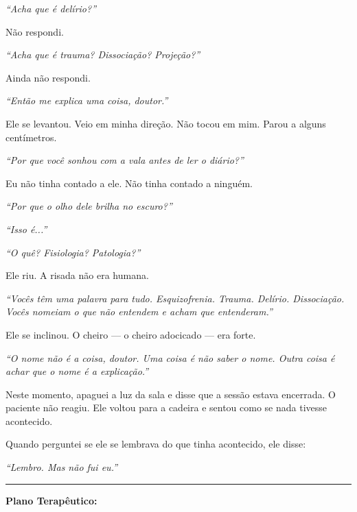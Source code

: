 \noindent \textit{\textquotedblleft{}Acha que é delírio?\textquotedblright{}}

\noindent Não respondi.

\noindent \textit{\textquotedblleft{}Acha que é trauma? Dissociação? Projeção?\textquotedblright{}}

\noindent Ainda não respondi.

\noindent \textit{\textquotedblleft{}Então me explica uma coisa, doutor.\textquotedblright{}}

\noindent Ele se levantou. Veio em minha direção. Não tocou em mim. Parou a alguns centímetros.

\noindent \textit{\textquotedblleft{}Por que você sonhou com a vala antes de ler o diário?\textquotedblright{}}

\noindent Eu não tinha contado a ele. Não tinha contado a ninguém.

\noindent \textit{\textquotedblleft{}Por que o olho dele brilha no escuro?\textquotedblright{}}

\noindent \textit{\textquotedblleft{}Isso é...\textquotedblright{}}

\noindent \textit{\textquotedblleft{}O quê? Fisiologia? Patologia?\textquotedblright{}}

\noindent Ele riu. A risada não era humana.

\noindent \textit{\textquotedblleft{}Vocês têm uma palavra para tudo. Esquizofrenia. Trauma. Delírio. Dissociação. Vocês nomeiam o que não entendem e acham que entenderam.\textquotedblright{}}

\noindent Ele se inclinou. O cheiro --- o cheiro adocicado --- era forte.

\noindent \textit{\textquotedblleft{}O nome não é a coisa, doutor. Uma coisa é não saber o nome. Outra coisa é achar que o nome é a explicação.\textquotedblright{}}

\noindent Neste momento, apaguei a luz da sala e disse que a sessão estava encerrada. O paciente não reagiu. Ele voltou para a cadeira e sentou como se nada tivesse acontecido.

\noindent Quando perguntei se ele se lembrava do que tinha acontecido, ele disse:

\noindent \textit{\textquotedblleft{}Lembro. Mas não fui eu.\textquotedblright{}}

\vspace{0.5em}\noindent\rule{\textwidth}{0.5pt}\vspace{0.5em}

\noindent \textbf{Plano Terapêutico:}

